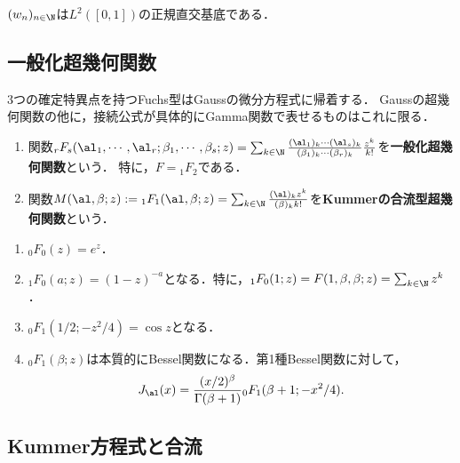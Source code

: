\documentclass[uplatex,dvipdfmx]{jsreport}
\begin{document}
\begin{proposition}
    $(w_n)_{n\in\N}$は$L^2([0,1])$の正規直交基底である．
\end{proposition}

\subsection{一般化超幾何関数}

\begin{tcolorbox}[colframe=ForestGreen, colback=ForestGreen!10!white,breakable,colbacktitle=ForestGreen!40!white,coltitle=black,fonttitle=\bfseries\sffamily,
title=]
    3つの確定特異点を持つFuchs型はGaussの微分方程式に帰着する．
    Gaussの超幾何関数の他に，接続公式が具体的にGamma関数で表せるものはこれに限る\cite{大島利雄-ODE}．
\end{tcolorbox}

\begin{definition}\mbox{}
    \begin{enumerate}
        \item 関数${}_rF_s(\al_1,\cdots,\al_r;\beta_1,\cdots,\beta_s;z)=\sum_{k\in\N}\frac{(\al_1)_k\cdots(\al_s)_k}{(\beta_1)_k\cdots(\beta_r)_k}\frac{z^k}{k!}$を\textbf{一般化超幾何関数}という．
        特に，$F={}_1F_2$である．
        \item 関数$M(\al,\beta;z):={}_1F_1(\al,\beta;z)=\sum_{k\in\N}\frac{(\al)_kz^k}{(\beta)_kk!}$を\textbf{Kummerの合流型超幾何関数}という．
    \end{enumerate}
\end{definition}

\begin{remarks}\mbox{}
    \begin{enumerate}
        \item ${}_0F_0(z)=e^z$．
        \item ${}_1F_0(a;z)=(1-z)^{-a}$となる．特に，${}_1F_0(1;z)=F(1,\beta,\beta;z)=\sum_{k\in\N}z^k$．
        \item ${}_0F_1(1/2;-z^2/4)=\cos z$となる．
        \item ${}_0F_1(\beta;z)$は本質的にBessel関数になる．第1種Bessel関数に対して，
        \[J_\al(x)=\frac{(x/2)^\beta}{\Gamma(\beta+1)}{}_0F_1(\beta+1;-x^2/4).\]
    \end{enumerate}  
\end{remarks}

\subsection{Kummer方程式と合流}
\end{document}
